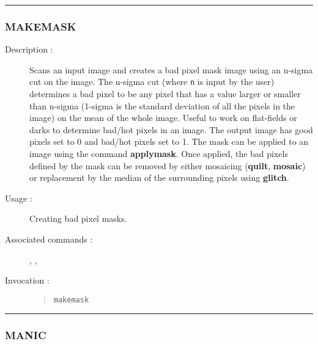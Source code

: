 \hrule
\subsubsection*{\label{MAKEMASK}MAKEMASK}

\begin{description}

\item[Description :] Scans an input image and creates a bad pixel mask
image using an n-sigma cut on the image.  The n-sigma cut (where {\tt n} is
input by the user) determines a bad pixel to be any pixel that has a
value larger or smaller than n-sigma (1-sigma is the standard deviation
of all the pixels in the image) on the mean of the whole image.  Useful
to work on flat-fields or darks to determine bad/hot pixels in an
image.  The output image has good pixels set to 0 and bad/hot pixels
set to 1.  The mask can be applied to an image using the command
{\bf applymask}.  Once applied, the bad pixels defined by the mask can be
removed by either mosaicing ({\bf quilt}, {\bf mosaic}) or replacement by the
median of the surrounding pixels using {\bf glitch}.

\item[Usage :] Creating bad pixel masks.

\item[Associated commands :] {\tt {}},
{\tt {}}, {\tt {}}

\item[Invocation :]

\begin{quote}{\tt  makemask }\end{quote}

\end{description}

\hrule
\subsubsection*{\label{MANIC}MANIC}

